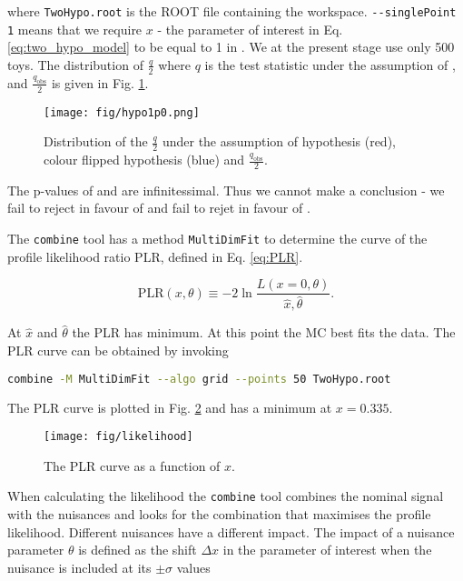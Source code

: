 where  \lstinline[language=sh]|TwoHypo.root| is the ROOT file containing the workspace. \lstinline[language=sh]|--singlePoint 1| means that we require $x$ - the parameter of interest in Eq. \ref{eq:two_hypo_model} to be equal to 1 in \Halt. We at the present stage use only 500 toys. The distribution of $\frac{q}{2}$ where $q$ is the test statistic under the assumption of \Hnull, \Halt and $\frac{q_{\text{obs}}}{2}$ is given in Fig. \ref{fig:hypo1p0}.

\begin{figure}
  \centering
  \texttt{[image: fig/hypo1p0.png]}
  \caption{Distribution of the $\frac{q}{2}$ under the assumption of \ttbar hypothesis (red), colour flipped \ttbar hypothesis (blue) and $\frac{q_{\text{obs}}}{2}$.}
  \label{fig:hypo1p0}
\end{figure}

The p-values of \Halt and \Hnull are infinitessimal. Thus we cannot make a conclusion - we fail to reject \Hnull in favour of \Halt and fail to rejet \Halt in favour of \Hnull.

The \lstinline[language=sh]|combine| tool has a method \lstinline[language=sh]|MultiDimFit| to determine the curve of the profile likelihood ratio PLR, defined in Eq. \ref{eq:PLR}.

\begin{equation}
  \text{PLR}(x, \theta)\equiv-2\ln\frac{L(x=0, \theta)}{\hat{x}, \hat{\theta}}.
  \label{eq:PLR}              
\end{equation}

At $\hat{x}$ and $\hat{\theta}$ the PLR has minimum. At this point the MC best fits the data. The PLR curve can be obtained by invoking

\begin{lstlisting}[language=sh, breaklines=true]
combine -M MultiDimFit --algo grid --points 50 TwoHypo.root
\end{lstlisting}

The PLR curve is plotted in Fig. \ref{fig:likelihood} and has a minimum at $x=0.335$.

\begin{figure}
  \centering
  \texttt{[image: fig/likelihood]}
  \caption{The PLR curve as a function of $x$.}
  \label{fig:likelihood}
\end{figure}

When calculating the likelihood the \lstinline[language=sh]|combine| tool combines the nominal signal with the nuisances and looks for the combination that maximises the profile likelihood. Different nuisances have a different impact. The impact of a nuisance parameter $\theta$ is defined as the shift $\Delta x$ in the parameter of interest when the nuisance is included at its $\pm\sigma$ values

